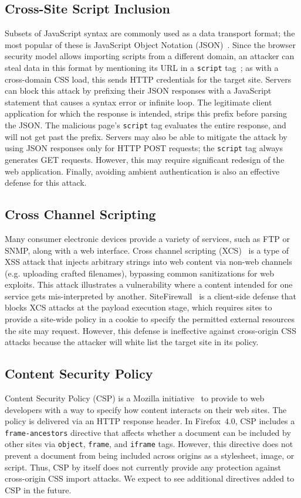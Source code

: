 \documentclass{sig-alternate}
\begin{document}
\subsection{Cross-Site Script Inclusion} \label{sec:json}
Subsets of JavaScript syntax are commonly used as a data transport
format; the most popular of these is JavaScript Object Notation
(JSON)~\cite{json}.  Since the browser security model allows importing
scripts from a different domain, an attacker can steal data in this
format by mentioning its URL in a \texttt{script}
tag~\cite{jshijacking}; as with a cross-domain CSS load, this sends
HTTP credentials for the target site.  Servers can block this attack
by prefixing their JSON responses with a JavaScript statement that
causes a syntax error or infinite loop.  The legitimate client
application for which the response is intended, strips this prefix
before parsing the JSON.  The malicious page's \texttt{script} tag
evaluates the entire response, and will not get past the prefix.
Servers may also be able to mitigate the attack by using JSON
responses only for HTTP POST requests; the \texttt{script} tag always
generates GET requests.  However, this may require significant
redesign of the web application.  Finally, avoiding ambient
authentication is also an effective defense for this attack.

\subsection{Cross Channel Scripting}
Many consumer electronic devices provide a variety of services, such as FTP or
SNMP, along with a web interface. Cross channel scripting (XCS)~\cite{xcs} is a
type of XSS attack that injects arbitrary strings into web content via non-web
channels (e.g. uploading crafted filenames), bypassing common sanitizations for
web exploits. This attack illustrates a vulnerability where a content intended
for one service gets mis-interpreted by another. SiteFirewall~\cite{xcs} is a
client-side defense that blocks XCS attacks at the payload execution stage,
which requires sites to provide a site-wide policy in a cookie to specify the
permitted external resources the site may request. However, this defense is
ineffective against cross-origin CSS attacks because the attacker will white
list the target site in its policy.

\subsection{Content Security Policy}
Content Security Policy (CSP) is a Mozilla initiative~\cite{csp} to provide to
web developers with a way to specify how content interacts on their web sites.
The policy is delivered via an HTTP response header. In Firefox~4.0, CSP
includes a \verb|frame-ancestors| directive that affects whether a document
can be included by other sites via \verb|object|, \verb|frame|, and
\verb|iframe| tags. However, this directive does not prevent a document from
being included across origins as a stylesheet, image, or script. Thus, CSP by
itself does not currently provide any protection against cross-origin CSS
import attacks. We expect to see additional directives added to CSP in the
future.
\end{document}
